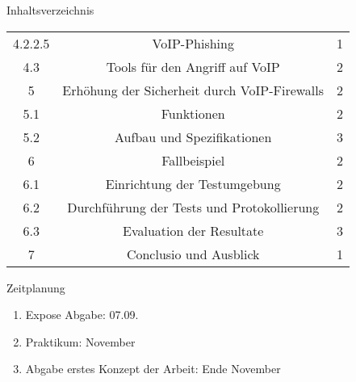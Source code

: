 \documentclass[a4paper,11pt,ngerman]{INSOexpose}
\begin{document}
\begin{section}{Inhaltsverzeichnis}
\begin{longtable}{c|c|c}
4.2.2.5 & VoIP-Phishing & 1 \\ 
4.3 & Tools für den Angriff auf VoIP & 2 \\
5 & Erhöhung der Sicherheit durch VoIP-Firewalls & 2 \\ 
5.1 & Funktionen &  2\\ 
5.2 & Aufbau und Spezifikationen &  3\\ 
6 & Fallbeispiel &  2\\ 
6.1 & Einrichtung der Testumgebung & 2 \\ 
6.2 & Durchführung der Tests und Protokollierung & 2 \\ 
6.3 & Evaluation der Resultate & 3 \\ 
7 & Conclusio und Ausblick & 1 \\ 
\end{longtable} 
\end{section}
\pagebreak

\begin{section}{Zeitplanung}
\begin{enumerate}
\item Expose Abgabe: 07.09.
\item Praktikum: November
\item Abgabe erstes Konzept der Arbeit: Ende November
\end{enumerate}
\end{section}
\pagebreak

\printbibliography
\end{document}
